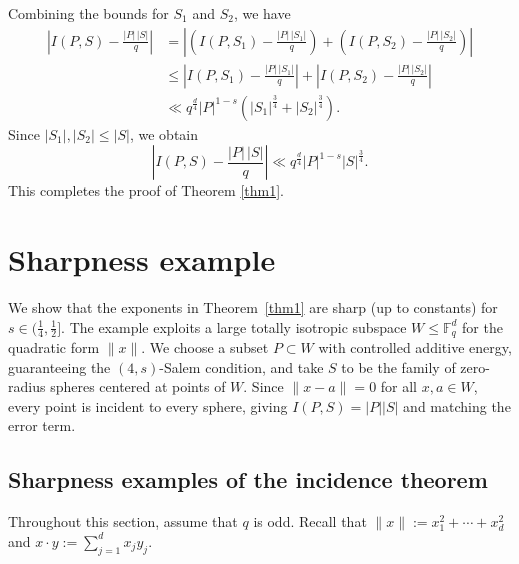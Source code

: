 \documentclass{article}
\begin{document}


Combining the bounds for $S_1$ and $S_2$, we have
\[
\begin{aligned}
\left| I(P,S) - \frac{|P| \, |S|}{q} \right|
&= \left| \left(I(P,S_1) - \frac{|P| \, |S_1|}{q}\right)
    + \left(I(P,S_2) - \frac{|P| \, |S_2|}{q}\right) \right| \\
&\le \left| I(P,S_1) - \frac{|P| \, |S_1|}{q} \right|
     + \left| I(P,S_2) - \frac{|P| \, |S_2|}{q} \right| \\
&\ll q^{\frac{d}{4}} |P|^{1-s}
   \left( |S_1|^{\frac{3}{4}} + |S_2|^{\frac{3}{4}} \right).
\end{aligned}
\]
Since $|S_1|, |S_2| \le |S|$, we obtain
\[
\left| I(P,S) - \frac{|P| \, |S|}{q} \right|
\ll q^{\frac{d}{4}} |P|^{1-s} |S|^{\frac{3}{4}}.
\]
This completes the proof of Theorem \ref{thm1}.

\section{Sharpness example}\label{sec:sharpness}

We show that the exponents in Theorem~\ref{thm1} are sharp (up to constants) for $s \in \big( \frac{1}{4}, \frac{1}{2} \big]$. The example exploits a large totally isotropic subspace $W\le \mathbb{F}_q^d$ for the quadratic
form $\|x\|$. We choose a subset $P\subset W$ with controlled additive energy, guaranteeing the $(4,s)$-Salem condition, and take $S$ to be the family of zero-radius spheres centered at points of $W$. Since $\|x-a\|=0$ for all $x,a\in W$, every point is incident to every sphere, giving $I(P,S)=|P||S|$ and matching the error term.



\subsection{Sharpness examples of the incidence theorem}
Throughout this section, assume that $q$ is odd.
Recall that $\|x\|:=x_1^2+\cdots+x_d^2$ and $x\cdot y:=\sum\limits_{j=1}^d x_jy_j$.
\end{document}
